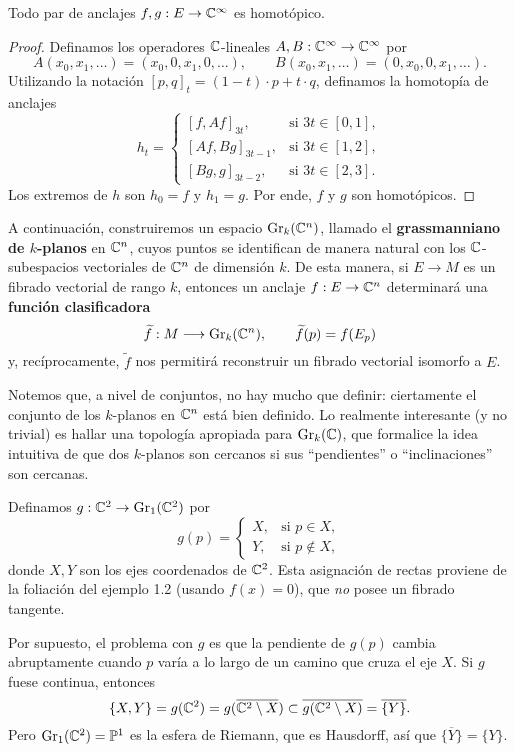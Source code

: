 \begin{proposition}
Todo par de anclajes $f, g : E \to \mathbb C^\infty$ es homotópico.
\end{proposition}

\begin{proof}
Definamos los operadores $\mathbb C$-lineales $A, B : \mathbb C^\infty \to \mathbb C^\infty$ por
$$A(x_0, x_1, \dots) = (x_0, 0, x_1, 0, \dots), \qquad B(x_0, x_1, \dots) = (0, x_0, 0, x_1, \dots).$$
Utilizando la notación $[p,q]_t = (1 - t) \cdot p + t \cdot q$, definamos la homotopía de anclajes
$$
h_t =
  \begin{cases}
    [f, Af]_{3t},      & \text{si } 3t \in [0,1], \\
    [Af, Bg]_{3t - 1}, & \text{si } 3t \in [1,2], \\
    [Bg, g]_{3t - 2},  & \text{si } 3t \in [2,3].
  \end{cases}
$$
Los extremos de $h$ son $h_0 = f$ y $h_1 = g$. Por ende, $f$ y $g$ son homotópicos.
\end{proof}

A continuación, construiremos un espacio $\operatorname{Gr}_k(\mathbb C^n)$, llamado el \textbf{grassmanniano de $k$-planos} en $\mathbb C^n$, cuyos puntos se identifican de manera natural con los $\mathbb C$-subespacios vectoriales de $\mathbb C^n$ de dimensión $k$. De esta manera, si $E \to M$ es un fibrado vectorial de rango $k$, entonces un anclaje $f : E \to \mathbb C^n$ determinará una \textbf{función clasificadora}
$$\widetilde f : M \longrightarrow \operatorname{Gr}_k(\mathbb C^n), \qquad \widetilde f(p) = f(E_p)$$
y, recíprocamente, $\widetilde f$ nos permitirá reconstruir un fibrado vectorial isomorfo a $E$.

Notemos que, a nivel de conjuntos, no hay mucho que definir: ciertamente el conjunto de los $k$-planos en $\mathbb C^n$ está bien definido. Lo realmente interesante (y no trivial) es hallar una topología apropiada para $\operatorname{Gr}_k(\mathbb C)$, que formalice la idea intuitiva de que dos $k$-planos son cercanos si sus ``pendientes'' o ``inclinaciones'' son cercanas.

\begin{example}
Definamos $g : \mathbb C^2 \to \operatorname{Gr}_1(\mathbb C^2)$ por
$$
g(p) =
  \begin{cases}
    X, & \text{si } p \in X, \\
    Y, & \text{si } p \notin X,
  \end{cases}
$$
donde $X, Y$ son los ejes coordenados de $\mathbb C^2$. Esta asignación de rectas proviene de la foliación del ejemplo 1.2 (usando $f(x) = 0$), que \textit{no} posee un fibrado tangente.

Por supuesto, el problema con $g$ es que la pendiente de $g(p)$ cambia abruptamente cuando $p$ varía a lo largo de un camino que cruza el eje $X$. Si $g$ fuese continua, entonces
$$\{ X, Y \} = g(\mathbb C^2) = g(\overline {\mathbb C^2 \setminus X}) \subset \overline {g(\mathbb C^2 \setminus X)} = \overline {\{ Y \}}.$$
Pero $\operatorname{Gr}_1(\mathbb C^2) = \mathbb P^1$ es la esfera de Riemann, que es Hausdorff, así que $\overline {\{ Y \}} = \{ Y \}$.
\end{example}

